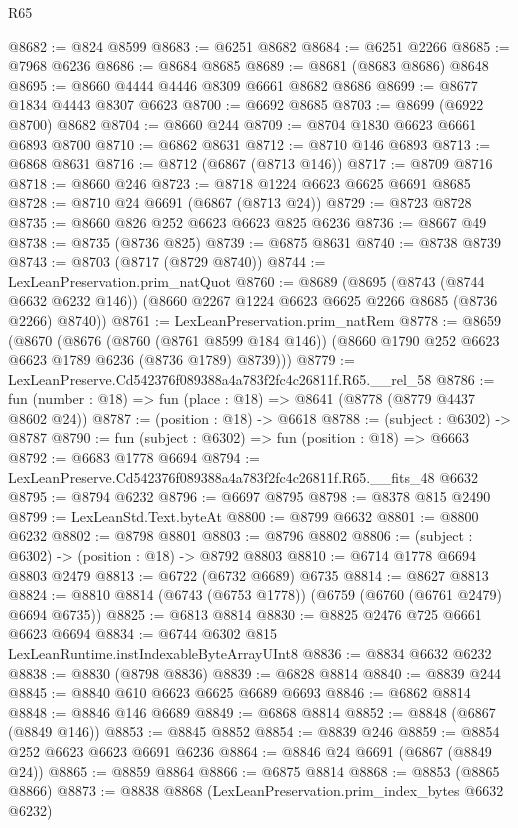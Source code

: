 \begin{lexlean}{R65}
\begin{coremodule}
{@8682 := @824 @8599
@8683 := @6251 @8682
@8684 := @6251 @2266
@8685 := @7968 @6236
@8686 := @8684 @8685
@8689 := @8681 (@8683 @8686) @8648
@8695 := @8660 @4444 @4446 @8309 @6661 @8682 @8686
@8699 := @8677 @1834 @4443 @8307 @6623
@8700 := @6692 @8685
@8703 := @8699 (@6922 @8700) @8682
@8704 := @8660 @244
@8709 := @8704 @1830 @6623 @6661 @6893 @8700
@8710 := @6862 @8631
@8712 := @8710 @146 @6893
@8713 := @6868 @8631
@8716 := @8712 (@6867 (@8713 @146))
@8717 := @8709 @8716
@8718 := @8660 @246
@8723 := @8718 @1224 @6623 @6625 @6691 @8685
@8728 := @8710 @24 @6691 (@6867 (@8713 @24))
@8729 := @8723 @8728
@8735 := @8660 @826 @252 @6623 @6623 @825 @6236
@8736 := @8667 @49
@8738 := @8735 (@8736 @825)
@8739 := @6875 @8631
@8740 := @8738 @8739
@8743 := @8703 (@8717 (@8729 @8740))
@8744 := LexLeanPreservation.prim_natQuot
@8760 := @8689
    (@8695
      (@8743 (@8744 @6632 @6232 @146))
      (@8660 @2267 @1224 @6623 @6625 @2266 @8685 (@8736 @2266) @8740))
@8761 := LexLeanPreservation.prim_natRem
@8778 := @8659
    (@8670
      (@8676
        (@8760 (@8761 @8599 @184 @146))
        (@8660 @1790 @252 @6623 @6623 @1789 @6236 (@8736 @1789) @8739)))
@8779 := LexLeanPreserve.Cd542376f089388a4a783f2fc4c26811f.R65.__rel_58
@8786 := fun (number : @18) => fun (place : @18) => @8641 (@8778 (@8779 @4437 @8602 @24))
@8787 := (position : @18) -> @6618
@8788 := (subject : @6302) -> @8787
@8790 := fun (subject : @6302) => fun (position : @18) => @6663
@8792 := @6683 @1778 @6694
@8794 := LexLeanPreserve.Cd542376f089388a4a783f2fc4c26811f.R65.__fits_48 @6632
@8795 := @8794 @6232
@8796 := @6697 @8795
@8798 := @8378 @815 @2490
@8799 := LexLeanStd.Text.byteAt
@8800 := @8799 @6632
@8801 := @8800 @6232
@8802 := @8798 @8801
@8803 := @8796 @8802
@8806 := (subject : @6302) -> (position : @18) -> @8792 @8803
@8810 := @6714 @1778 @6694 @8803 @2479
@8813 := @6722 (@6732 @6689) @6735
@8814 := @8627 @8813
@8824 := @8810 @8814 (@6743 (@6753 @1778)) (@6759 (@6760 (@6761 @2479) @6694 @6735))
@8825 := @6813 @8814
@8830 := @8825 @2476 @725 @6661 @6623 @6694
@8834 := @6744 @6302 @815 LexLeanRuntime.instIndexableByteArrayUInt8
@8836 := @8834 @6632 @6232
@8838 := @8830 (@8798 @8836)
@8839 := @6828 @8814
@8840 := @8839 @244
@8845 := @8840 @610 @6623 @6625 @6689 @6693
@8846 := @6862 @8814
@8848 := @8846 @146 @6689
@8849 := @6868 @8814
@8852 := @8848 (@6867 (@8849 @146))
@8853 := @8845 @8852
@8854 := @8839 @246
@8859 := @8854 @252 @6623 @6623 @6691 @6236
@8864 := @8846 @24 @6691 (@6867 (@8849 @24))
@8865 := @8859 @8864
@8866 := @6875 @8814
@8868 := @8853 (@8865 @8866)
@8873 := @8838 @8868 (LexLeanPreservation.prim_index_bytes @6632 @6232)
}
\end{coremodule}
\end{lexlean}
